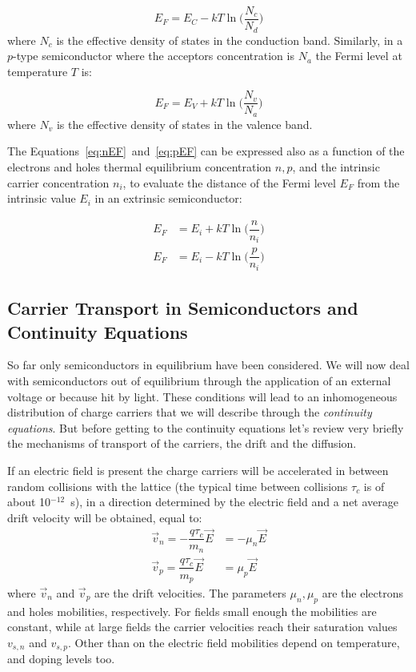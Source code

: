 \begin{equation}
E_F=E_C-kT\ln\Big(\dfrac{N_c}{N_d}\Big)
\label{eq:nEF}
\end{equation}
where $N_c$ is the effective density of states in the conduction band. 
Similarly, in a $p$-type semiconductor where the acceptors concentration is $N_a$ the 
Fermi level at temperature $T$ is:

\begin{equation}
E_F=E_V+kT\ln\Big(\dfrac{N_v}{N_a}\Big)
\label{eq:pEF}
\end{equation}
where $N_v$ is the effective density of states in the valence band. 

The Equations~\ref{eq:nEF}~and~\ref{eq:pEF} can be expressed also as a function of the 
electrons and holes thermal equilibrium concentration $n,p$, and the intrinsic carrier concentration 
$n_i$, to evaluate  the distance of the Fermi level $E_F$ from the intrinsic value $E_i$ 
in an extrinsic semiconductor:

\begin{align}
E_F&=E_i+kT\ln\Big(\dfrac{n}{n_i}\Big)\label{eq:nEini}\\
E_F&=E_i-kT\ln\Big(\dfrac{p}{n_i}\Big)\label{eq:pEini}
\end{align} 




\subsection{Carrier Transport in Semiconductors and Continuity Equations}

So far only semiconductors in equilibrium have been considered. We will now deal with 
semiconductors out of equilibrium through the application of an external voltage or because 
hit by light. These conditions will lead to an inhomogeneous distribution of charge carriers that 
we will describe through the {\it continuity equations}. But before
 getting to the continuity equations let's 
review very briefly the mechanisms of transport of the 
carriers, the drift and the diffusion.

If an electric field is present the charge carriers will be accelerated in between random collisions  
with the lattice 
(the typical time between collisions $\tau_c$ is of about 10$^{-12}$~s), 
in a direction determined by the electric field and a net average drift velocity will be obtained, 
equal to:
\begin{align}
\vec{v}_n=-\dfrac{q\tau_c}{m_n}\vec{E}&=-\mu_n\vec{E}\label{eq:nDrift}\\
\vec{v}_p=\dfrac{q\tau_c}{m_p}\vec{E}&=\mu_p\vec{E}\label{eq:pDrift}
\end{align}
where $\vec{v}_n$ and $\vec{v}_p$ are the drift velocities.
The parameters $\mu_n,\mu_p$ are the electrons and holes mobilities, respectively. 
For fields small enough the mobilities are constant, while at large fields the carrier velocities 
reach their saturation values $v_{s,n}$ and $v_{s,p}$. Other than on the electric field mobilities depend on 
temperature, and doping levels too.

